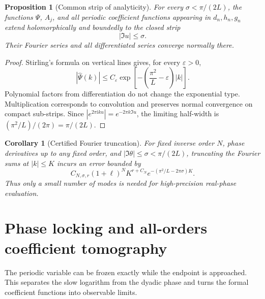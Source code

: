 \documentclass[11pt,oneside]{article}
\numberwithin{equation}{section}
\newtheorem{proposition}[theorem]{Proposition}
\newtheorem{corollary}[theorem]{Corollary}
\theoremstyle{definition}
\theoremstyle{remark}
\newcommand{\ii}{\mathrm i}
\newcommand{\eps}{\varepsilon}
\newcommand{\Psihat}{\widehat\Psi}
\begin{document}
\begin{proposition}[Common strip of analyticity]
\label{prop:analytic-strip}
For every $\sigma<\pi/(2L)$, the functions $\Psi$, $A_j$, and all periodic coefficient functions appearing in $d_n,h_n,g_n$ extend holomorphically and boundedly to the closed strip
\begin{equation}
 |\Im u|\le\sigma.
 \label{eq:analytic-strip}
\end{equation}
Their Fourier series and all differentiated series converge normally there.
\end{proposition}

\begin{proof}
Stirling's formula on vertical lines gives, for every $\eps>0$,
\begin{equation}
 |\Psihat(k)|\le C_\eps
 \exp\left[-\left(\frac{\pi^2}{L}-\eps\right)|k|\right].
 \label{eq:Psi-decay}
\end{equation}
Polynomial factors from differentiation do not change the exponential type.  Multiplication corresponds to convolution and preserves normal convergence on compact sub-strips.  Since
$|e^{2\pi\ii ku}|=e^{-2\pi k\Im u}$, the limiting half-width is
$(\pi^2/L)/(2\pi)=\pi/(2L)$.
\end{proof}

\begin{corollary}[Certified Fourier truncation]
For fixed inverse order $N$, phase derivatives up to any fixed order, and
$|\Im\theta|\le\sigma<\pi/(2L)$, truncating the Fourier sums at $|k|\le K$ incurs an error bounded by
\begin{equation}
 C_{N,\sigma,r}(1+\ell)^N K^{r+C_N}
 e^{-(\pi^2/L-2\pi\sigma)K}.
 \label{eq:fourier-truncation-bound}
\end{equation}
Thus only a small number of modes is needed for high-precision real-phase evaluation.
\end{corollary}

\section{Phase locking and all-orders coefficient tomography}
\label{sec:phase-locking}

The periodic variable can be frozen exactly while the endpoint is approached.  This separates the slow logarithm from the dyadic phase and turns the formal coefficient functions into observable limits.
\end{document}

